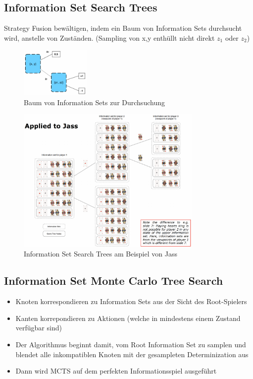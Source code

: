 \documentclass[a4paper]{article}
\begin{document}
		\subsection{Information Set Search Trees}

		Strategy Fusion bewältigen, indem ein Baum von Information Sets durchsucht wird, anstelle von Zuständen.
		(Sampling von {x,y} enthüllt nicht direkt $z_{1}$ oder $z_{2}$)

		\begin{figure}[htb!]
			\centering
			\includegraphics[width=0.3\textwidth]{img/03_information_sets/infoset_search_tree.png}
			\caption{Baum von Information Sets zur Durchsuchung}
			\label{fig:03_infoset_infoset_search_tree}
		\end{figure}
	
		\begin{figure}[htb!]
			\centering
			\includegraphics[width=0.8\textwidth]{img/03_information_sets/jass_search_tree.png}
			\caption{Information Set Search Trees am Beispiel von Jass}
			\label{fig:03_infoset_jass_search_tree}
		\end{figure}
	
		\subsection{Information Set Monte Carlo Tree Search}
		
		\begin{itemize}
			\item Knoten korrespondieren zu Information Sets aus der Sicht des Root-Spielers
			\item Kanten korrepondieren zu Aktionen (welche in mindestens einem Zustand verfügbar sind)
			\item Der Algorithmus beginnt damit, vom Root Information Set zu samplen und blendet alle inkompatiblen Knoten mit der gesampleten Determinization aus
			\item Dann wird MCTS auf dem perfekten Informationsspiel ausgeführt
		\end{itemize}
	
\end{document}
